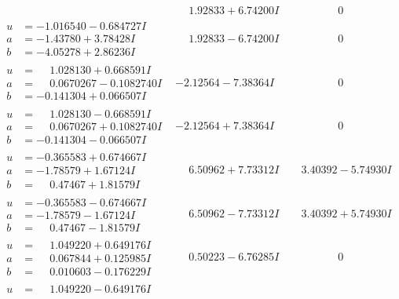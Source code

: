 \documentclass[1p]{elsarticle_modified}
\theoremstyle{definition}
\begin{document}
$$\begin{array}{c|c|c}
 & \phantom{-}1.92833 + 6.74200 I & \phantom{-0.000000 } 0 \\ \hline\begin{aligned}
u &= -1.016540 - 0.684727 I \\
a &= -1.43780 + 3.78428 I \\
b &= -4.05278 + 2.86236 I\end{aligned}
 & \phantom{-}1.92833 - 6.74200 I & \phantom{-0.000000 } 0 \\ \hline\begin{aligned}
u &= \phantom{-}1.028130 + 0.668591 I \\
a &= \phantom{-}0.0670267 - 0.1082740 I \\
b &= -0.141304 + 0.066507 I\end{aligned}
 & -2.12564 - 7.38364 I & \phantom{-0.000000 } 0 \\ \hline\begin{aligned}
u &= \phantom{-}1.028130 - 0.668591 I \\
a &= \phantom{-}0.0670267 + 0.1082740 I \\
b &= -0.141304 - 0.066507 I\end{aligned}
 & -2.12564 + 7.38364 I & \phantom{-0.000000 } 0 \\ \hline\begin{aligned}
u &= -0.365583 + 0.674667 I \\
a &= -1.78579 + 1.67124 I \\
b &= \phantom{-}0.47467 + 1.81579 I\end{aligned}
 & \phantom{-}6.50962 + 7.73312 I & \phantom{-}3.40392 - 5.74930 I \\ \hline\begin{aligned}
u &= -0.365583 - 0.674667 I \\
a &= -1.78579 - 1.67124 I \\
b &= \phantom{-}0.47467 - 1.81579 I\end{aligned}
 & \phantom{-}6.50962 - 7.73312 I & \phantom{-}3.40392 + 5.74930 I \\ \hline\begin{aligned}
u &= \phantom{-}1.049220 + 0.649176 I \\
a &= \phantom{-}0.067844 + 0.125985 I \\
b &= \phantom{-}0.010603 - 0.176229 I\end{aligned}
 & \phantom{-}0.50223 - 6.76285 I & \phantom{-0.000000 } 0 \\ \hline\begin{aligned}
u &= \phantom{-}1.049220 - 0.649176 I \\

\end{aligned}
\end{array}$$
\end{document}
